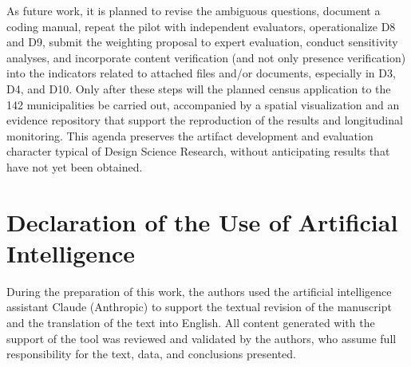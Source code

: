 \documentclass[12pt]{article}
\begin{document}
As future work, it is planned to revise the ambiguous questions, document a coding manual, repeat the pilot with independent evaluators, operationalize D8 and D9, submit the weighting proposal to expert evaluation, conduct sensitivity analyses, and incorporate content verification (and not only presence verification) into the indicators related to attached files and/or documents, especially in D3, D4, and D10. Only after these steps will the planned census application to the 142 municipalities be carried out, accompanied by a spatial visualization and an evidence repository that support the reproduction of the results and longitudinal monitoring. This agenda preserves the artifact development and evaluation character typical of Design Science Research, without anticipating results that have not yet been obtained.

\section*{Declaration of the Use of Artificial Intelligence}

During the preparation of this work, the authors used the artificial intelligence assistant Claude (Anthropic) to support the textual revision of the manuscript and the translation of the text into English. All content generated with the support of the tool was reviewed and validated by the authors, who assume full responsibility for the text, data, and conclusions presented.




\end{document}
